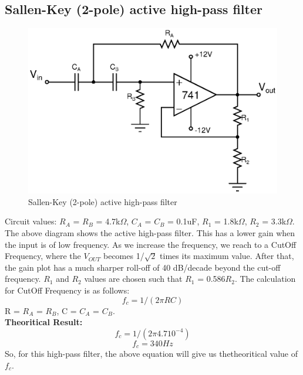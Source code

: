 \documentclass[12pt]{article}
\begin{document}
\subsection{ Sallen-Key (2-pole) active high-pass filter}
\begin{figure}[H]
\begin{center}
\includegraphics[scale = 0.8]{p2.eps}
\caption{ Sallen-Key (2-pole) active high-pass filter}
\end{center}
\end{figure}
Circuit values: $R_A$ = $R_B$ = 4.7k$\Omega $, $C_A$ = $C_B$ = 0.1uF, $R_1$ = 1.8k$\Omega $, $R_2$ = 3.3k$\Omega $.\\
The above diagram shows the active high-pass filter. This has a lower gain when the input is of low frequency. As we increase the frequency, we reach to a CutOff Frequency, where the $V_{OUT}$ becomes 1/$\sqrt{2} $ times its maximum value. After that, the gain plot has a much sharper roll-off of 40 dB/decade beyond the cut-off frequency. $R_1$ and $R_2$ values are chosen such that $R_1$ = 0.586$R_2$. The calculation for CutOff Frequency is as follows:
\begin{equation}
   f_c = 1/(2\pi RC)
 \end{equation}
R = $R_A$ = $R_B$, C =  $C_A$ =  $C_B$.\\
\textbf{Theoritical Result:} \\
\begin{equation}
    f_c = 1/(2\pi 4.7 10^{-4})
 \end{equation}
\begin{equation}
    f_c = 340Hz
 \end{equation}
So, for this high-pass filter, the above equation will give us thetheoritical value of $f_c$.
\end{document}
